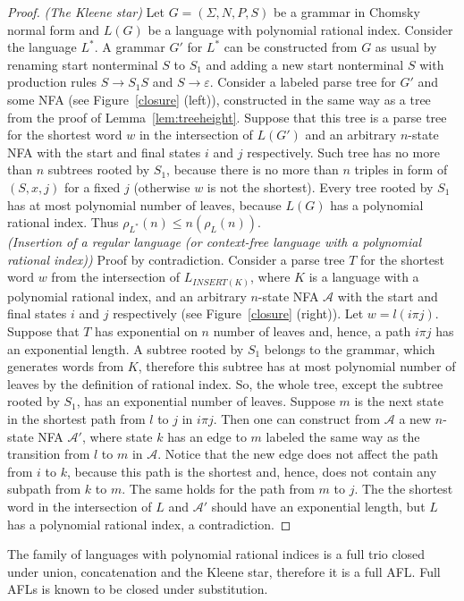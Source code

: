 \begin{proof}
\textit{(The Kleene star)} Let $G = (\Sigma, N, P, S)$ be a grammar in Chomsky normal form and $L(G)$ be a language with polynomial rational index. Consider the language $L^{*}$. A grammar $G'$ for $L^{*}$ can be constructed from $G$ as usual by renaming start nonterminal $S$ to $S_1$ and adding a new start nonterminal $S$ with production rules $S \rightarrow S_1S$ and $S \rightarrow \varepsilon$. Consider a labeled parse tree for $G'$ and some NFA (see Figure~\ref{closure} (left)), constructed in the same way as a tree from the proof of Lemma~\ref{lem:treeheight}. Suppose that this tree is a parse tree for the shortest word $w$ in the intersection of $L(G')$ and an arbitrary $n$-state NFA with the start and final states $i$ and $j$ respectively. Such tree has no more than $n$ subtrees rooted by $S_1$, because there is no more than $n$ triples in form of $(S, x, j)$ for a fixed $j$ (otherwise $w$ is not the shortest). Every tree rooted by $S_1$ has at most polynomial number of leaves, because $L(G)$ has a polynomial rational index. Thus $\rho_{L^{*}}(n) \le n(\rho_L(n))$.
\\
\textit{(Insertion of a regular language (or context-free language with a polynomial rational index))} Proof by contradiction. Consider a parse tree $T$ for the shortest word $w$ from the intersection of $L_{INSERT(K)}$, where $K$ is a language with a polynomial rational index, and an arbitrary $n$-state NFA $\mathcal{A}$ with the start and final states $i$ and $j$ respectively (see Figure~\ref{closure} (right)). Let $w = l(i \pi j)$. Suppose that $T$ has exponential on $n$ number of leaves and, hence, a path $i \pi j$ has an exponential length. A subtree rooted by $S_1$ belongs to the grammar, which generates words from $K$, therefore this subtree has at most polynomial number of leaves by the definition of rational index. So, the whole tree, except the subtree rooted by $S_1$, has an exponential number of leaves. Suppose $m$ is the next state in the shortest path from $l$ to $j$ in $i \pi j$. Then one can construct from $\mathcal{A}$ a new $n$-state NFA $\mathcal{A'}$, where state $k$ has an edge to $m$ labeled the same way as the transition from $l$ to $m$ in $\mathcal{A}$. Notice that the new edge does not affect the path from $i$ to $k$, because this path is the shortest and, hence, does not contain any subpath from $k$ to $m$. The same holds for the path from $m$ to $j$. The the shortest word in the intersection of $L$ and $\mathcal{A'}$ should have an exponential length, but $L$ has a polynomial rational index, a contradiction.
\end{proof}
The family of languages with polynomial rational indices is a full trio closed under union, concatenation and the Kleene star, therefore it is a full AFL. Full AFLs is known to be closed under substitution.


